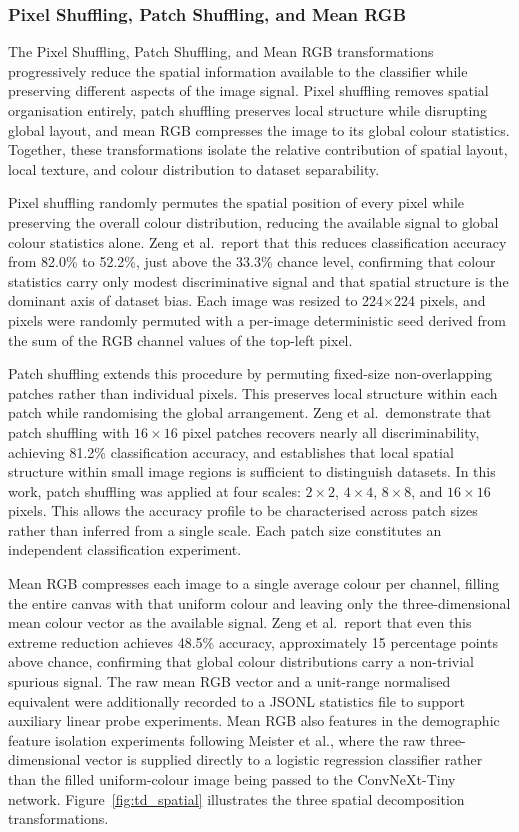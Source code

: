 \subsubsection{Pixel Shuffling, Patch Shuffling, and Mean RGB}
\label{subsec:spatial_decomposition}

The Pixel Shuffling, Patch Shuffling, and Mean RGB transformations progressively reduce the spatial information available to the classifier while preserving different aspects of the image signal. Pixel shuffling removes spatial organisation entirely, patch shuffling preserves local structure while disrupting global layout, and mean RGB compresses the image to its global colour statistics. Together, these transformations isolate the relative contribution of spatial layout, local texture, and colour distribution to dataset separability.

Pixel shuffling randomly permutes the spatial position of every pixel while preserving the overall colour distribution, reducing the available signal to global colour statistics alone. Zeng et al.\ report that this reduces classification accuracy from 82.0\% to 52.2\%, just above the 33.3\% chance level, confirming that colour statistics carry only modest discriminative signal and that spatial structure is the dominant axis of dataset bias. Each image was resized to 224$\times$224 pixels, and pixels were randomly permuted with a per-image deterministic seed derived from the sum of the RGB channel values of the top-left pixel.

Patch shuffling extends this procedure by permuting fixed-size non-overlapping patches rather than individual pixels. This preserves local structure within each patch while randomising the global arrangement. Zeng et al.\ demonstrate that patch shuffling with $16\times16$ pixel patches recovers nearly all discriminability, achieving 81.2\% classification accuracy, and establishes that local spatial structure within small image regions is sufficient to distinguish datasets. In this work, patch shuffling was applied at four scales: $2\times2$, $4\times4$, $8\times8$, and $16\times16$ pixels. This allows the accuracy profile to be characterised across patch sizes rather than inferred from a single scale. Each patch size constitutes an independent classification experiment.

Mean RGB compresses each image to a single average colour per channel, filling the entire canvas with that uniform colour and leaving only the three-dimensional mean colour vector as the available signal. Zeng et al.\ report that even this extreme reduction achieves 48.5\% accuracy, approximately 15 percentage points above chance, confirming that global colour distributions carry a non-trivial spurious signal. The raw mean RGB vector and a unit-range normalised equivalent were additionally recorded to a JSONL statistics file to support auxiliary linear probe experiments. Mean RGB also features in the demographic feature isolation experiments following Meister et al., where the raw three-dimensional vector is supplied directly to a logistic regression classifier rather than the filled uniform-colour image being passed to the ConvNeXt-Tiny network. Figure~\ref{fig:td_spatial} illustrates the three spatial decomposition transformations.

